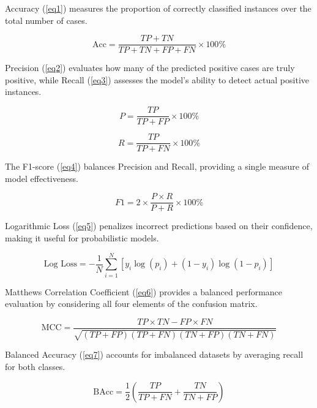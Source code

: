 \documentclass[preprint,12pt,authoryear]{elsarticle}
\begin{document}
Accuracy (\ref{eq1}) measures the proportion of correctly classified instances over the total number of cases.  

\begin{equation}
\text{Acc} = \frac{TP + TN}{TP + TN + FP + FN} \times 100\%
\label{eq1}
\end{equation}

Precision (\ref{eq2}) evaluates how many of the predicted positive cases are truly positive, while Recall (\ref{eq3}) assesses the model’s ability to detect actual positive instances.  

\begin{equation}
P = \frac{TP}{TP + FP} \times 100\%
\label{eq2}
\end{equation}

\begin{equation}
R = \frac{TP}{TP + FN} \times 100\%
\label{eq3}
\end{equation}

The F1-score (\ref{eq4}) balances Precision and Recall, providing a single measure of model effectiveness.  

\begin{equation}
F1 = 2 \times \frac{P \times R}{P + R} \times 100\%
\label{eq4}
\end{equation}

Logarithmic Loss (\ref{eq5}) penalizes incorrect predictions based on their confidence, making it useful for probabilistic models.  

\begin{equation}
\text{Log Loss} = -\frac{1}{N} \sum_{i=1}^{N} \left[ y_i \log(p_i) + (1 - y_i) \log(1 - p_i) \right]
\label{eq5}
\end{equation}

Matthews Correlation Coefficient (\ref{eq6}) provides a balanced performance evaluation by considering all four elements of the confusion matrix.  

\begin{equation}
\text{MCC} = \frac{TP \times TN - FP \times FN}{\sqrt{(TP + FP)(TP + FN)(TN + FP)(TN + FN)}}
\label{eq6}
\end{equation}

Balanced Accuracy (\ref{eq7}) accounts for imbalanced datasets by averaging recall for both classes.  

\begin{equation}
\text{BAcc} = \frac{1}{2} \left( \frac{TP}{TP + FN} + \frac{TN}{TN + FP} \right)
\label{eq7}
\end{equation}
\end{document}
